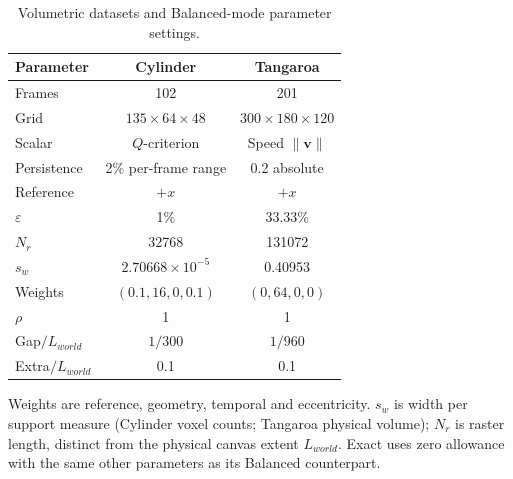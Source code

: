 \begin{table}[t]
\centering
\caption{Volumetric datasets and Balanced-mode parameter settings.}
\label{tab:volume-parameters}
\footnotesize
\setlength{\tabcolsep}{2pt}
\renewcommand{\arraystretch}{0.95}
\begin{tabular}{@{}lcc@{}}
\toprule
Parameter & Cylinder & Tangaroa \\
\midrule
Frames & 102 & 201 \\
Grid & $135\times64\times48$ & $300\times180\times120$ \\
Scalar & $Q$-criterion & Speed $\|\mathbf{v}\|$ \\
Persistence & 2\% per-frame range & 0.2 absolute \\
Reference & $+x$ & $+x$ \\
$\varepsilon$ & 1\% & 33.33\% \\
$N_r$ & 32768 & 131072 \\
$s_w$ & $2.70668\times10^{-5}$ & 0.40953 \\
Weights & $(0.1,16,0,0.1)$ & $(0,64,0,0)$ \\
$\rho$ & 1 & 1 \\
Gap$/L_{world}$ & $1/300$ & $1/960$ \\
Extra$/L_{world}$ & 0.1 & 0.1 \\
\bottomrule
\end{tabular}
\vspace{2pt}
\begin{minipage}{0.94\columnwidth}\footnotesize Weights are reference, geometry, temporal and eccentricity. $s_w$ is width per support measure (Cylinder voxel counts; Tangaroa physical volume); $N_r$ is raster length, distinct from the physical canvas extent $L_{world}$. Exact uses zero allowance with the same other parameters as its Balanced counterpart.\end{minipage}
\end{table}
